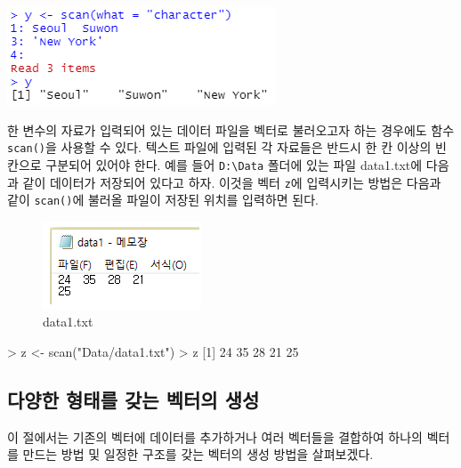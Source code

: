 \documentclass[
]{book}
\newenvironment{Shaded}{\begin{snugshade}}{\end{snugshade}}
\newcommand{\DecValTok}[1]{\textcolor[rgb]{0.00,0.00,0.81}{#1}}
\newcommand{\FunctionTok}[1]{\textcolor[rgb]{0.00,0.00,0.00}{#1}}
\newcommand{\NormalTok}[1]{#1}
\newcommand{\OtherTok}[1]{\textcolor[rgb]{0.56,0.35,0.01}{#1}}
\newcommand{\SpecialCharTok}[1]{\textcolor[rgb]{0.00,0.00,0.00}{#1}}
\newcommand{\StringTok}[1]{\textcolor[rgb]{0.31,0.60,0.02}{#1}}
\begin{document}
\includegraphics{Figure/scan_char.png}

한 변수의 자료가 입력되어 있는 데이터 파일을 벡터로 불러오고자 하는 경우에도 함수 \texttt{scan()}을 사용할 수 있다.
텍스트 파일에 입력된 각 자료들은 반드시 한 칸 이상의 빈 칸으로 구분되어 있어야 한다.
예를 들어 \texttt{D:\textbackslash{}Data} 폴더에 있는 파일 data1.txt에 다음과 같이 데이터가 저장되어 있다고 하자.
이것을 벡터 \texttt{z}에 입력시키는 방법은 다음과 같이 \texttt{scan()}에 불러올 파일이 저장된 위치를 입력하면 된다.

\begin{figure}
\centering
\includegraphics{Figure/data1.png}
\caption{data1.txt}
\end{figure}

\begin{Shaded}
\begin{Highlighting}[]
\SpecialCharTok{\textgreater{}}\NormalTok{ z }\OtherTok{\textless{}{-}} \FunctionTok{scan}\NormalTok{(}\StringTok{"Data/data1.txt"}\NormalTok{)}
\SpecialCharTok{\textgreater{}}\NormalTok{ z}
\NormalTok{[}\DecValTok{1}\NormalTok{] }\DecValTok{24} \DecValTok{35} \DecValTok{28} \DecValTok{21} \DecValTok{25}
\end{Highlighting}
\end{Shaded}

\hypertarget{uxb2e4uxc591uxd55c-uxd615uxd0dcuxb97c-uxac16uxb294-uxbca1uxd130uxc758-uxc0dduxc131}{%
\subsection{다양한 형태를 갖는 벡터의 생성}\label{uxb2e4uxc591uxd55c-uxd615uxd0dcuxb97c-uxac16uxb294-uxbca1uxd130uxc758-uxc0dduxc131}}

이 절에서는 기존의 벡터에 데이터를 추가하거나 여러 벡터들을 결합하여 하나의 벡터를 만드는 방법 및 일정한 구조를 갖는 벡터의 생성 방법을 살펴보겠다.
\end{document}
